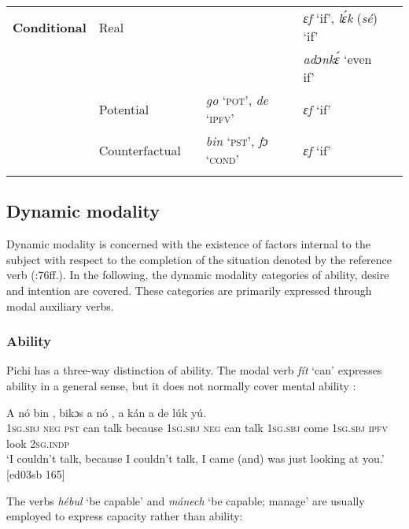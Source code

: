 \begin{sidewaystable}
\begin{tabularx}{\textwidth}{llQQQQ}
\midrule
\textbf{Conditional} &  Real &  &  & \textit{ɛf} ‘if’, \textit{lɛ́k} (\textit{sé}) ‘if’ & \\
&&  &  & \textit{adɔnkɛ́} ‘even if’ & \\
&Potential &  & \textit{go} {‘}{\textsc{pot}}{’,} \textit{de} {‘}{\textsc{ipfv}}{’} & \textit{ɛf} ‘if’ & \\
&Counterfactual &  & \textit{bin} {‘}{\textsc{pst}}{’,} \textit{fɔ} {‘}{\textsc{cond’}} & \textit{ɛf} ‘if’ & \\
\lspbottomrule
\end{tabularx}
\end{sidewaystable}
\subsection{Dynamic modality}

Dynamic modality is concerned with the existence of factors internal to the subject with respect to the completion of the situation denoted by the reference verb (\citealt{Palmer2001}:76ff.). In the following, the dynamic modality categories of ability, desire and intention are covered. These categories are primarily expressed through modal auxiliary verbs.

\subsubsection{Ability}\label{sec:6.7.2.1}

Pichi has a three-way distinction of ability. The modal verb \textit{fít} ‘can’ expresses ability in a general sense, but it does not normally cover mental ability : 


\ea%
    \label{ex:key:406}
    \gll \MakeUppercase{A}   nó  bin   ,    bikɔs  a    nó   ,
a    kán    a    de  lúk    yú.\\
\textsc{1sg.sbj}  \textsc{neg}  \textsc{pst}  can  talk    because  \textsc{1sg.sbj}  \textsc{neg}  can  talk
\textsc{1sg.sbj}  come  \textsc{1sg.sbj}  \textsc{ipfv}  look    \textsc{2sg.indp}\\

\glt ‘I couldn’t talk, because I couldn’t talk, I came (and) was just looking at you.’ [ed03sb 165]
\z

The verbs \textit{hébul} ‘be capable’  and \textit{mánech} ‘be capable; manage’  are usually employed to express capacity rather than ability:


